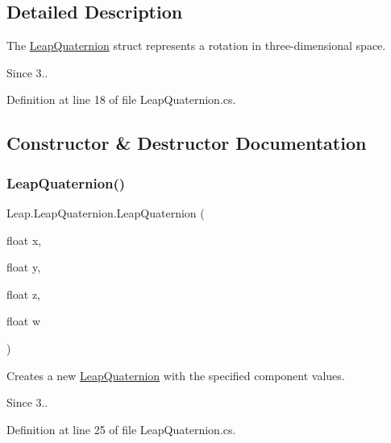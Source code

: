\subsection{Detailed Description}
The \mbox{\hyperlink{struct_leap_1_1_leap_quaternion}{Leap\+Quaternion}} struct represents a rotation in three-\/dimensional space. 

\begin{DoxySince}{Since}
3.. 
\end{DoxySince}


Definition at line 18 of file Leap\+Quaternion.\+cs.



\subsection{Constructor \& Destructor Documentation}
\mbox{\label{struct_leap_1_1_leap_quaternion_ad357d24e097721fe94ed64bb349d74ad}} 
\subsubsection{\texorpdfstring{LeapQuaternion()}{LeapQuaternion()}\hspace{0.1cm}{\footnotesize\ttfamily [1/3]}}
{\footnotesize\ttfamily Leap.\+Leap\+Quaternion.\+Leap\+Quaternion (\begin{DoxyParamCaption}\item[{float}]{x,  }\item[{float}]{y,  }\item[{float}]{z,  }\item[{float}]{w }\end{DoxyParamCaption})}



Creates a new \mbox{\hyperlink{struct_leap_1_1_leap_quaternion}{Leap\+Quaternion}} with the specified component values. 

\begin{DoxySince}{Since}
3.. 
\end{DoxySince}


Definition at line 25 of file Leap\+Quaternion.\+cs.

\mbox{\label{struct_leap_1_1_leap_quaternion_a84f12596d668c2f5448a55dcbda52057}} 

